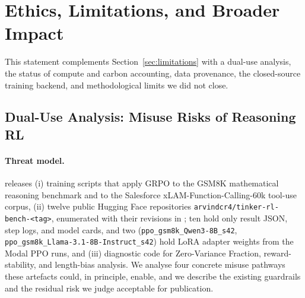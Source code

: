 
\section{Ethics, Limitations, and Broader Impact}
\label{sec:impact_standalone}

This statement complements Section~\ref{sec:limitations} with a dual-use
analysis, the status of compute and carbon accounting, data provenance, the
closed-source training backend, and methodological limits we did not close.

\subsection{Dual-Use Analysis: Misuse Risks of Reasoning RL}
\label{sec:dualuse}

\paragraph{Threat model.}
\ours{} releases (i) training scripts that apply GRPO to the GSM8K
\cite{cobbe2021training} mathematical reasoning benchmark and to the
Salesforce xLAM-Function-Calling-60k \cite{liu2024xlam} tool-use corpus,
(ii) twelve public Hugging Face repositories
\texttt{arvindcr4/tinker-rl-bench-<tag>}, enumerated with their revisions in
; ten hold only
result JSON, step logs, and model cards, and two
(\texttt{ppo\_gsm8k\_Qwen3-8B\_s42}, \texttt{ppo\_gsm8k\_Llama-3.1-8B-Instruct\_s42})
hold LoRA adapter weights from the Modal PPO runs, and (iii) diagnostic code for
Zero-Variance Fraction, reward-stability, and length-bias analysis. We
analyse four concrete misuse pathways these artefacts could, in principle,
enable, and we describe the existing guardrails and the residual risk we
judge acceptable for publication.

